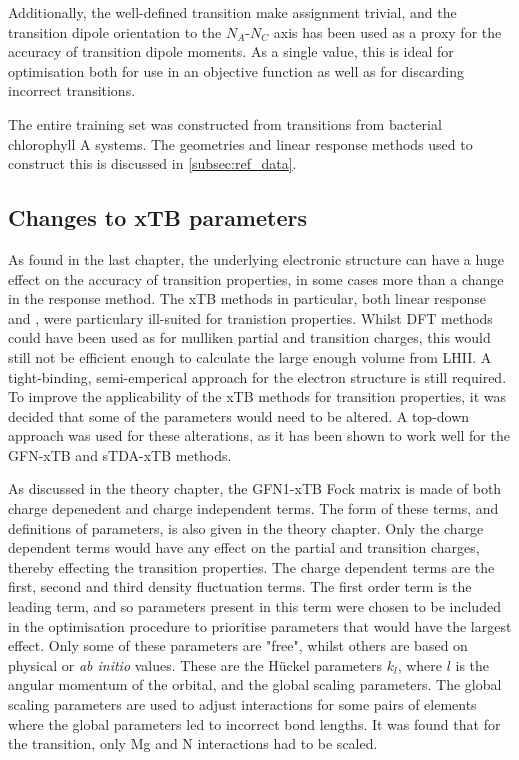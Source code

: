 Additionally, the well-defined transition make assignment trivial, and the transition
dipole orientation to the $N_A$-$N_C$ axis has been used as a proxy for the accuracy
of transition dipole moments. As a single value, this is ideal for optimisation 
both for use in an objective function as well as for discarding incorrect transitions.

The entire training set was constructed from \Qy transitions from bacterial chlorophyll 
A systems. The geometries and linear response methods used to construct this is
discussed in \ref{subsec:ref_data}.

\subsection{Changes to xTB parameters}
\label{subsec:chl_method}

As found in the last chapter, the underlying electronic structure can have a huge
effect on the accuracy of transition properties, in some cases more than a change
in the response method. The xTB methods in particular, both linear response and
\dxtb, were particulary ill-suited for tranistion properties. Whilst DFT methods
could have been used as for mulliken partial and transition charges, this would
still not be efficient enough to calculate the large enough volume from LHII. A 
tight-binding, semi-emperical approach for the electron structure is still required.
To improve the applicability of the xTB methods for transition properties, it was
decided that some of the parameters would need to be altered. A top-down approach
was used for these alterations, as it has been shown to work well for the GFN-xTB
and sTDA-xTB methods. 

As discussed in the theory chapter, the GFN1-xTB Fock matrix is made of both charge
depenedent and charge independent terms. The form of these terms, and definitions
of parameters, is also given in the theory chapter. Only the charge dependent terms would
have any effect on the partial and transition charges, thereby effecting the transition
properties. The charge dependent terms are the first, second and third density fluctuation
terms. The first order term is the leading term, and so parameters present in this
term were chosen to be included in the optimisation procedure to prioritise parameters
that would have the largest effect. Only some of these parameters are "free", 
whilst others are based on physical or \emph{ab initio} values. These are the H{\"u}ckel
parameters $k_l$, where $l$ is the angular momentum of the orbital, and the global
scaling parameters. The global scaling parameters are used to adjust interactions
for some pairs of elements where the global parameters led to incorrect bond lengths.
It was found that for the \Qy transition, only Mg and N interactions had to be scaled.

